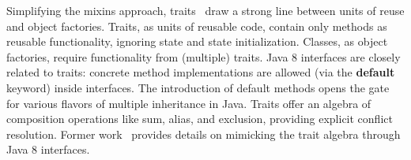 Simplifying the mixins approach, traits~\cite{scharli03traits} draw a strong
line between units of reuse and object factories. Traits, as units of reusable
code, contain only methods as reusable functionality, ignoring state and state
initialization. Classes, as object factories, require functionality from
(multiple) traits. Java 8 interfaces are closely related to
traits: concrete method implementations are allowed (via the \textbf{default}
keyword) inside interfaces. The introduction of default methods opens the gate
for various flavors of multiple inheritance in Java. Traits offer an algebra
of composition operations like sum, alias, and exclusion, providing explicit conflict
resolution. Former work~\cite{bono14} provides details on mimicking the trait
algebra through Java 8 interfaces.

\begin{comment}
We briefly recall the main points of their
encoding; however we propose a different representation of \textbf{exclusion}.
The first author of~\cite{bono14} agreed (via personal communication) that
our revised version for exclusion is cleaner, typesafe and more direct.
\newcommand\shortItem{\vspace{-1ex}}
\begin{itemize}
\item \textbf{Symmetric sum} can be obtained by simple multiple inheritance between interfaces.
    \begin{lstlisting}
    interface A { int x(); }
    interface B { int y(); }
    interface C extends A, B {}
    \end{lstlisting}
\shortItem
\item \textbf{Overriding} a conflict is obtained by specifying which super interface take precedence.
    \begin{lstlisting}
    interface A { default int m() {return 1;} }
    interface B { default int m() {return 2;} }
    interface C extends A, B {
        default int m() {return B.super.m();} }
    \end{lstlisting}
\shortItem
\item \textbf{Alias} is creating  a new method delegating to the existing super interface.
    \begin{lstlisting}
    interface A { default int m() {return 1;} }
    interface B extends A {
        default int k() {return A.super.m();} }
    \end{lstlisting}
\shortItem

\item \textbf{Exclusion}: exclusion is also supported in Java, where method declarations can hide the default methods correspondingly in the super interfaces.
    \begin{lstlisting}
    interface A { default int m() {return 1;} }
    interface B extends A { int m(); }
    \end{lstlisting}
\shortItem
\end{itemize}
\end{comment}

